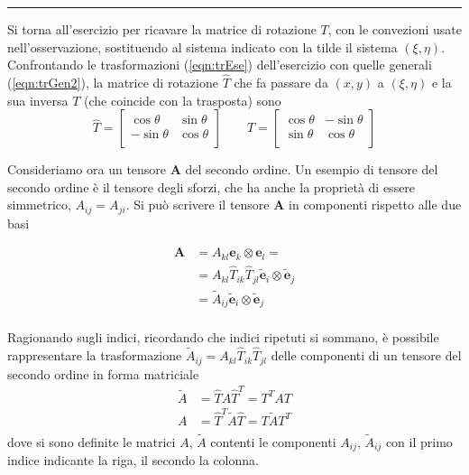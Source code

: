  \vspace{0.05cm}
 \begin{center}
 \rule{0.75\textwidth}{.4pt}
 \end{center}
 \vspace{0.2cm}
 
 Si torna all'esercizio per ricavare la matrice di rotazione $T$, con le convezioni usate nell'osservazione, sostituendo
 al sistema indicato con la tilde il sistema $(\xi,\eta)$.
 Confrontando le trasformazioni (\ref{eqn:trEse}) dell'esercizio con quelle generali (\ref{eqn:trGen2}),
 la matrice di rotazione $\hat{T}$ che fa passare da $(x,y)$ a $(\xi,\eta)$ e la sua 
 inversa  $T$ (che coincide con la trasposta) sono
 \begin{equation}
 \hat{T} = \begin{bmatrix} 
  \cos{\theta} & \sin{\theta} \\
 -\sin{\theta} & \cos{\theta} \\
 \end{bmatrix}
 \qquad
 T = \begin{bmatrix} 
  \cos{\theta} & -\sin{\theta} \\
  \sin{\theta} &  \cos{\theta} \\
 \end{bmatrix}
 \end{equation}
 
 Consideriamo ora un tensore $\bm{A}$ del secondo ordine. Un esempio di tensore del secondo ordine è il tensore degli sforzi, 
 che ha anche la proprietà di essere simmetrico, $A_{ij} = A_{ji}$. Si può scrivere il tensore $\bm{A}$ in componenti rispetto alle due basi

 \begin{equation}
 \begin{aligned}
  \bm{A} & = A_{kl} \bm{e}_k \otimes \bm{e}_l = \\
   & = {A}_{kl} \hat{T}_{ik} \hat{T}_{jl} \tilde{\bm{e}}_i \otimes \tilde{\bm{e}}_j \\
   & = \tilde{A}_{ij} \tilde{\bm{e}}_i \otimes \tilde{\bm{e}}_j \\
 \end{aligned}
 \end{equation}
 
 Ragionando sugli indici, ricordando che indici ripetuti si sommano, è possibile rappresentare la trasformazione
 $\tilde{A}_{ij} = {A}_{kl} \hat{T}_{ik} \hat{T}_{jl}$
 delle componenti di un tensore del secondo ordine in forma matriciale
 \begin{equation}
 \begin{aligned}
   \tilde{A} & = \hat{T} A \hat{T}^T = T^T A T \\
   A & = \hat{T}^T \tilde{A} \hat{T} = T \tilde{A} T^T \\
 \label{eqn:trasfT2}
 \end{aligned}
 \end{equation}
 dove si sono definite le matrici $A$, $\tilde{A}$ contenti le componenti $A_{ij}$, $\tilde{A}_{ij}$ con il primo
  indice indicante la riga, il secondo la colonna.
  

